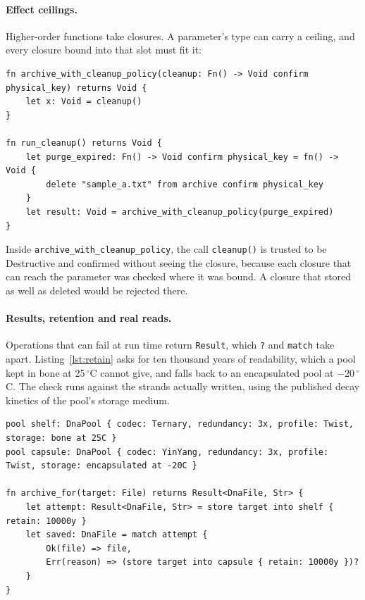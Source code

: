 \documentclass[11pt,a4paper]{article}
\newcommand{\nsl}[1]{\texttt{#1}}
\begin{document}
\paragraph{Effect ceilings.} Higher-order functions take closures. A
parameter's type can carry a ceiling, and every closure bound into that
slot must fit it:

\begin{lstlisting}[caption={A closure parameter with a ceiling (\texttt{effect\_annotated\_closure.nsl}, shortened).},label=lst:ceiling]
fn archive_with_cleanup_policy(cleanup: Fn() -> Void confirm physical_key) returns Void {
    let x: Void = cleanup()
}

fn run_cleanup() returns Void {
    let purge_expired: Fn() -> Void confirm physical_key = fn() -> Void {
        delete "sample_a.txt" from archive confirm physical_key
    }
    let result: Void = archive_with_cleanup_policy(purge_expired)
}
\end{lstlisting}

Inside \nsl{archive\_with\_cleanup\_policy}, the call \nsl{cleanup()} is
trusted to be Destructive and confirmed without seeing the closure,
because each closure that can reach the parameter was checked where it
was bound. A closure that stored as well as deleted would be rejected
there.

\paragraph{Results, retention and real reads.} Operations that can fail
at run time return \nsl{Result}, which \nsl{?} and \nsl{match} take
apart. Listing~\ref{lst:retain} asks for ten thousand years of
readability, which a pool kept in bone at 25\,$^\circ$C cannot give, and
falls back to an encapsulated pool at $-20$\,$^\circ$C. The check runs
against the strands actually written, using the published decay
kinetics of the pool's storage medium.

\begin{lstlisting}[caption={A retention requirement with a fallback (\texttt{retention\_policy.nsl}, shortened).},label=lst:retain]
pool shelf: DnaPool { codec: Ternary, redundancy: 3x, profile: Twist, storage: bone at 25C }
pool capsule: DnaPool { codec: YinYang, redundancy: 3x, profile: Twist, storage: encapsulated at -20C }

fn archive_for(target: File) returns Result<DnaFile, Str> {
    let attempt: Result<DnaFile, Str> = store target into shelf { retain: 10000y }
    let saved: DnaFile = match attempt {
        Ok(file) => file,
        Err(reason) => (store target into capsule { retain: 10000y })?
    }
}
\end{lstlisting}
\end{document}
